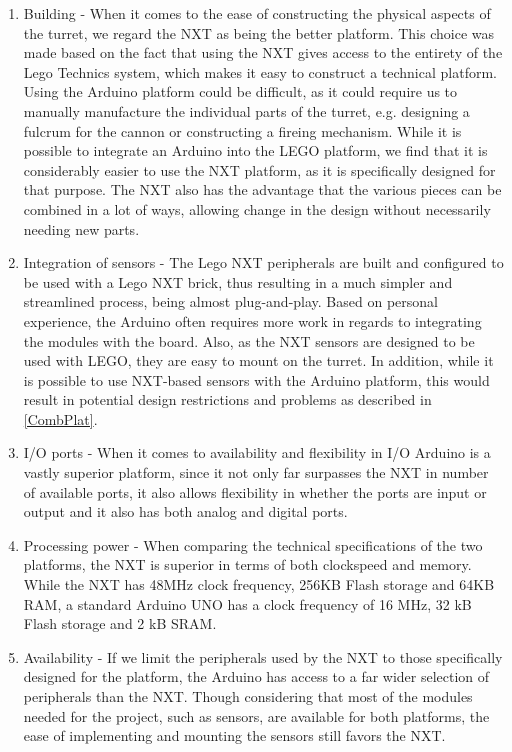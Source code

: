 \begin{enumerate}
  \item Building - When it comes to the ease of constructing the physical
  aspects of the turret, we regard the NXT as being the better platform. This
  choice was made based on the fact that using the NXT gives access to the
  entirety of the Lego Technics system, which makes it easy to construct a
  technical platform. Using the Arduino platform could be difficult, as it could
  require us to manually manufacture the individual parts of the turret, e.g.
  designing a fulcrum for the cannon or constructing a fireing mechanism.
  While it is possible to integrate an Arduino into the LEGO platform, we find
  that it is considerably easier to use the NXT platform, as it is specifically
  designed for that purpose. The NXT also has the advantage that the various
  pieces can be combined in a lot of ways, allowing change in the design without
  necessarily needing new parts.
  
  \item Integration of sensors - The Lego NXT peripherals are built and
  configured to be used with a Lego NXT brick, thus resulting in a much simpler
  and streamlined process, being almost plug-and-play. Based on personal
  experience, the Arduino often requires more work in regards to integrating the
  modules with the board. Also, as the NXT sensors are designed to be used with
  LEGO, they are easy to mount on the turret. In addition, while it is possible
  to use NXT-based sensors with the Arduino platform, this would result in
  potential design restrictions and problems as described in \autoref{CombPlat}.
  
  \item I/O ports - When it comes to availability and flexibility in I/O
  Arduino is a vastly superior platform, since it not only far surpasses the NXT
  in number of available ports, it also allows flexibility in whether the ports
  are input or output and it also has both analog and digital ports.
  
  \item Processing power - When comparing the technical specifications of the
  two platforms, the NXT is superior in terms of both clockspeed and memory.
  While the NXT has 48MHz clock frequency, 256KB Flash storage and 64KB RAM, a
  standard Arduino UNO has a clock frequency of 16 MHz, 32 kB Flash storage and
  2 kB SRAM.
  
  \item Availability - If we limit the peripherals used by the NXT to those
  specifically designed for the platform, the Arduino has access to a far wider
  selection of peripherals than the NXT. Though considering that most of the
  modules needed for the project, such as sensors, are available for both
  platforms, the ease of implementing and mounting the sensors still favors the
  NXT.
\end{enumerate}

